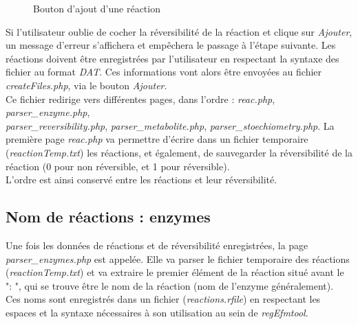 \begin{figure}[!ht]
    \begin{center}
        \caption{Bouton d'ajout d'une réaction}
          \label{boutonAjout}
      \end{center}   
\end{figure}

Si l'utilisateur oublie de cocher la réversibilité de la réaction et clique sur \emph{Ajouter}, un message d'erreur s'affichera et empêchera le passage à l'étape suivante. Les réactions doivent être enregistrées par l'utilisateur en respectant la syntaxe des fichier au format \emph{DAT}. Ces informations vont alors être envoyées au fichier \emph{createFiles.php}, via le bouton \emph{Ajouter}.\\
Ce fichier redirige vers différentes pages, dans l'ordre : \emph{reac.php}, \emph{parser\_enzyme.php},
\\ \emph{parser\_reversibility.php}, \emph{parser\_metabolite.php}, \emph{parser\_stoechiometry.php}.
La première page \emph{reac.php} va permettre d'écrire dans un fichier temporaire (\emph{reactionTemp.txt}) les réactions, et également, de sauvegarder la réversibilité de la réaction (0 pour non réversible, et 1 pour réversible).\\
L'ordre est ainsi conservé entre les réactions et leur réversibilité.

\subsection{Nom de réactions : enzymes}
Une fois les données de réactions et de réversibilité enregistrées, la page \emph{parser\_enzymes.php} est appelée. Elle va parser le fichier temporaire des réactions (\emph{reactionTemp.txt}) et va extraire le premier élément de la réaction situé avant le ": ", qui se trouve être le nom de la réaction (nom de l'enzyme généralement).\\
Ces noms sont enregistrés dans un fichier (\emph{reactions.rfile}) en respectant les espaces et la syntaxe nécessaires à son utilisation au sein de \emph{regEfmtool}.


